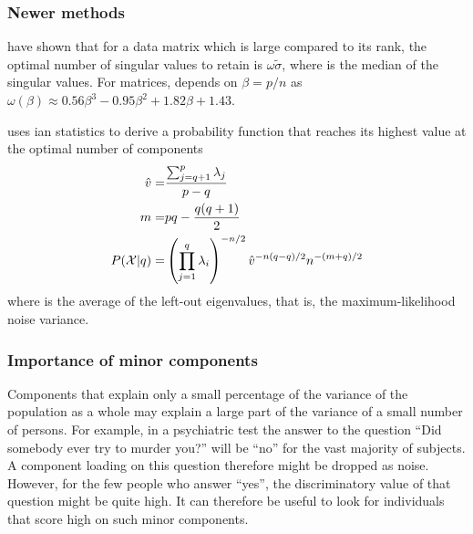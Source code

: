 \subsubsection{Newer methods}

 \parencite{Gav-14} have shown that for a data matrix which is large compared to its rank, the optimal number of singular values to retain is \(\omega\tilde{\sigma} \), where \skalar{\tilde{\sigma}} is the median of the singular values. For  matrices, \skalar{\omega} depends on \(\beta = p / n \) as \(\omega(\beta) \approx 0.56\beta^3 - 0.95\beta^2 + 1.82\beta + 1.43 \).

 \parencite{Min-00} uses ian statistics to derive a probability function that reaches its highest value at the optimal number of components
\begin{eqnarray}
   \nonumber
   \hat{v}      =& \frac{\sum_{j=q+1}^p{\lambda_j}}{p-q} \\
   \nonumber
   m            =& pq - \frac{q(q+1)}{2} \\
   P(\mathcal{X}|q) =& \left(\prod_{j=1}^q{\lambda_i}\right)^{-n/2} \hat{v}^{-n(q-q)/2} n^{-(m+q)/2}
\end{eqnarray}
where  is the average of the left-out eigenvalues, that is, the maximum-likelihood noise variance.

\subsubsection{Importance of minor components}

Components that explain only a small percentage of the variance of the population as a whole may explain a large part of the variance of a small number of persons. For example, in a psychiatric test the answer to the question ``Did somebody ever try to murder you?'' will be ``no'' for the vast majority of subjects. A component loading on this question therefore might be dropped as noise. However, for the few people who answer ``yes'', the discriminatory value of that question might be quite high. It can therefore be useful to look for individuals that score high on such minor components.

